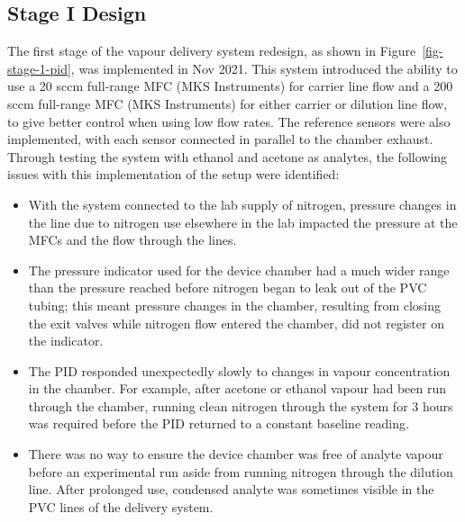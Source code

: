\documentclass[
  a4paper,
]{scrbook}
\begin{document}
\hypertarget{sec-vapour-system-design-1}{%
\subsection{Stage I Design}\label{sec-vapour-system-design-1}}

The first stage of the vapour delivery system redesign, as shown in
Figure~\ref{fig-stage-1-pid}, was implemented in Nov 2021. This system
introduced the ability to use a 20 sccm full-range MFC (MKS Instruments)
for carrier line flow and a 200 sccm full-range MFC (MKS Instruments)
for either carrier or dilution line flow, to give better control when
using low flow rates. The reference sensors were also implemented, with
each sensor connected in parallel to the chamber exhaust. Through
testing the system with ethanol and acetone as analytes, the following
issues with this implementation of the setup were identified:

\begin{itemize}
\item
  With the system connected to the lab supply of nitrogen, pressure
  changes in the line due to nitrogen use elsewhere in the lab impacted
  the pressure at the MFCs and the flow through the lines.
\item
  The pressure indicator used for the device chamber had a much wider
  range than the pressure reached before nitrogen began to leak out of
  the PVC tubing; this meant pressure changes in the chamber, resulting
  from closing the exit valves while nitrogen flow entered the chamber,
  did not register on the indicator.
\item
  The PID responded unexpectedly slowly to changes in vapour
  concentration in the chamber. For example, after acetone or ethanol
  vapour had been run through the chamber, running clean nitrogen
  through the system for 3 hours was required before the PID returned to
  a constant baseline reading.
\item
  There was no way to ensure the device chamber was free of analyte
  vapour before an experimental run aside from running nitrogen through
  the dilution line. After prolonged use, condensed analyte was
  sometimes visible in the PVC lines of the delivery system.
\end{itemize}
\end{document}
